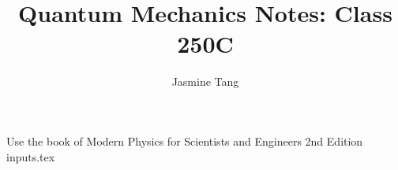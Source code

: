 \documentclass{article}
\title{Quantum Mechanics Notes: Class 250C}
\author{Jasmine Tang }
\theoremstyle{definition}
\begin{document}
\maketitle

\tableofcontents
Use the book of Modern Physics for Scientists and Engineers 2nd Edition
{inputs.tex}
\end{document}
